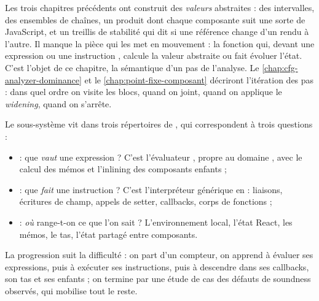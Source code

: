 
Les trois chapitres précédents ont construit des \emph{valeurs} abstraites :
des intervalles, des ensembles de chaînes, un produit  dont
chaque composante suit une sorte de JavaScript, et un treillis de stabilité
qui dit si une référence change d'un rendu à l'autre. Il manque la pièce qui
les met en mouvement : la fonction qui, devant une expression  ou
une instruction , calcule la valeur abstraite ou fait
évoluer l'état. C'est l'objet de ce chapitre, la \og sémantique d'un
pas\fg{} de l'analyse. Le \cref{chap:cfg-analyzer-dominance} et le
\cref{chap:point-fixe-composant} décriront \og l'itération des pas\fg{} :
dans quel ordre on visite les blocs, quand on joint, quand on applique le \emph{widening}, quand
on s'arrête.

Le sous-système vit dans trois répertoires de , qui
correspondent à trois questions :
\begin{itemize}
  \item {} : que \emph{vaut} une expression ? C'est
    l'évaluateur , propre au domaine
    , avec le calcul des mémos et l'inlining des
    composants enfants ;
  \item {} : que \emph{fait} une instruction ? C'est
    l'interpréteur générique en  : liaisons, écritures de
    champ, appels de setter, callbacks, corps de fonctions ;
  \item {} : \emph{où} range-t-on ce que l'on sait ?
    L'environnement local, l'état React, les mémos, le tas, l'état partagé
    entre composants.
\end{itemize}
La progression suit la difficulté : on part d'un compteur, on apprend à
évaluer ses expressions, puis à exécuter ses instructions, puis à descendre
dans ses callbacks, son tas et ses enfants ; on termine par une étude de cas
des défauts de soundness observés, qui mobilise tout le reste.

